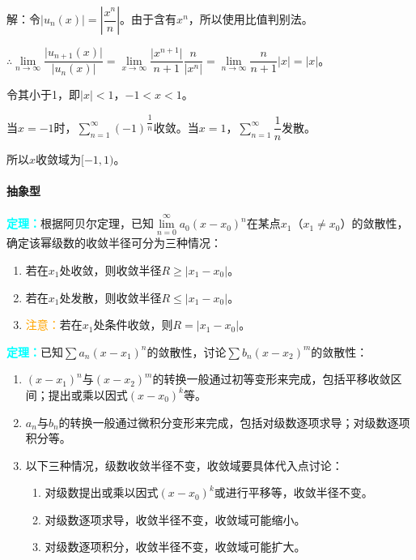 解：令$\vert u_n(x)\vert=\left\vert\dfrac{x^n}{n}\right\vert$。由于含有$x^n$，所以使用比值判别法。

$\therefore\lim\limits_{n\to\infty}\dfrac{\vert u_{n+1}(x)\vert}{\vert u_n(x)\vert}=\lim\limits_{x\to\infty}\dfrac{\vert x^{n+1}\vert}{n+1}\dfrac{n}{\vert x^n\vert}=\lim\limits_{n\to\infty}\dfrac{n}{n+1}\vert x\vert=\vert x\vert$。\medskip

令其小于1，即$\vert x\vert<1$，$-1<x<1$。

当$x=-1$时，$\sum\limits_{n=1}^\infty(-1)^\dfrac{1}{n}$收敛。当$x=1$，$\sum\limits_{n=1}^\infty\dfrac{1}{n}$发散。

所以$x$收敛域为$[-1,1)$。

\paragraph{抽象型} \leavevmode \medskip

\textcolor{aqua}{\textbf{定理：}}根据阿贝尔定理，已知$\lim\limits_{n=0}^\infty a_0(x-x_0)^n$在某点$x_1$（$x_1\neq x_0$）的敛散性，确定该幂级数的收敛半径可分为三种情况：

\begin{enumerate}
    \item 若在$x_1$处收敛，则收敛半径$R\geqslant\vert x_1-x_0\vert$。
    \item 若在$x_1$处发散，则收敛半径$R\leqslant\vert x_1-x_0\vert$。
    \item \textcolor{orange}{注意：}若在$x_1$处条件收敛，则$R=\vert x_1-x_0\vert$。
\end{enumerate}

\textcolor{aqua}{\textbf{定理：}}已知$\sum a_n(x-x_1)^n$的敛散性，讨论$\sum b_n(x-x_2)^m$的敛散性：

\begin{enumerate}
    \item $(x-x_1)^n$与$(x-x_2)^m$的转换一般通过初等变形来完成，包括平移收敛区间；提出或乘以因式$(x-x_0)^k$等。
    \item $a_n$与$b_n$的转换一般通过微积分变形来完成，包括对级数逐项求导；对级数逐项积分等。
    \item 以下三种情况，级数收敛半径不变，收敛域要具体代入点讨论：\begin{enumerate}
        \item 对级数提出或乘以因式$(x-x_0)^k$或进行平移等，收敛半径不变。
        \item 对级数逐项求导，收敛半径不变，收敛域可能缩小。
        \item 对级数逐项积分，收敛半径不变，收敛域可能扩大。
    \end{enumerate}
\end{enumerate}

